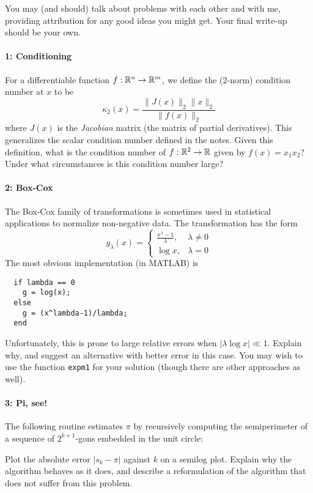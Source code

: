 \documentclass[12pt, leqno]{article} %
\begin{document}

You may (and should) talk about problems with each other and with me,
providing attribution for any good ideas you might get.  Your final
write-up should be your own.


\paragraph*{1: Conditioning}
For a differentiable function $f : \mathbb{R}^n \rightarrow \mathbb{R}^m$, we
define the (2-norm) condition number at $x$ to be
\[
  \kappa_2(x) = \frac{\|J(x)\|_2 \|x\|_2}{\|f(x)\|_2}
\]
where $J(x)$ is the {\em Jacobian} matrix (the matrix of partial
derivatives).  This generalizes the scalar condition number defined
in the notes.  Given this definition, what is the condition number of
$f : \mathbb{R}^2 \rightarrow \mathbb{R}$ given by $f(x) = x_1 x_2$?
Under what circumstances is this condition number large?

\paragraph*{2: Box-Cox}
The Box-Cox family of transformations is sometimes used in statistical
applications to normalize non-negative data.  The transformation has
the form
\[
  g_\lambda(x) =
  \begin{cases}
    \frac{x^\lambda-1}{\lambda}, & \lambda \neq 0 \\
    \log x, & \lambda = 0
  \end{cases}
\]
The most obvious implementation (in MATLAB) is
\begin{lstlisting}
  if lambda == 0
    g = log(x);
  else
    g = (x^lambda-1)/lambda;
  end
\end{lstlisting}
Unfortunately, this is prone to large relative errors when
$|\lambda \log x| \ll 1$.  Explain why, and suggest an alternative
with better error in this case.  You may wish to use the function
{\tt expm1} for your solution (though there are other approaches as well).

\paragraph*{3: Pi, see!}
The following routine estimates $\pi$ by recursively computing the
semiperimeter of a sequence of $2^{k+1}$-gons embedded in the unit circle:
\lstset{language=matlab,frame=lines,columns=flexible}

Plot the absolute error $|s_k-\pi|$ against $k$ on a semilog plot.
Explain why the algorithm behaves as it does, and describe a
reformulation of the algorithm that does not suffer from this problem.
\end{document}
